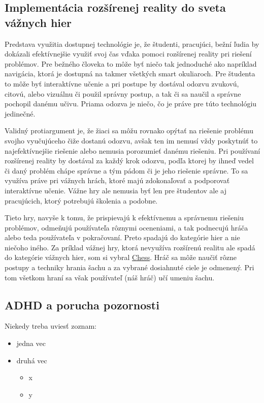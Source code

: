 \documentclass[10pt,twoside,a4paper]{article}
\begin{document}
\subsection{Implementácia rozšírenej reality do sveta vážnych hier}
\par Predstava využitia dostupnej technológie je, že študenti, pracujúci, bežní ľudia by dokázali efektívnejšie využiť svoj čas vďaka pomoci rozšírenej reality pri riešení problémov. Pre bežného človeka to môže byť niečo tak jednoduché ako napríklad navigácia, ktorá je dostupná na takmer všetkých smart okuliaroch. Pre študenta to môže byť interaktívne učenie a pri postupe by dostával odozvu zvukovú, citovú, alebo vizuálnu či použil správny postup, a tak či sa naučil a správne pochopil danému učivu. Priama odozva je niečo, čo je práve pre túto technológiu jedinečné. \par Validný protiargument je, že žiaci sa môžu rovnako opýtať na riešenie problému svojho vyučujúceho čiže dostanú odozvu, avšak ten im nemusí vždy poskytnúť to najefektívnejšie riešenie alebo nemusia porozumieť danému riešeniu. Pri používaní rozšírenej reality by dostával za každý krok odozvu, podľa ktorej by ihneď vedel či daný problém chápe správne a tým pádom či je jeho riešenie správne. To sa využíva práve pri vážnych hrách, ktoré majú zdokonaľovať a podporovať interaktívne učenie. Vážne hry ale nemusia byť len pre študentov ale aj pracujúcich, ktorý potrebujú školenia a podobne. \par Tieto hry, navyše k tomu, že prispievajú k efektívnemu a správnemu riešeniu problémov, odmeňujú používateľa rôznymi oceneniami, a tak podnecujú hráča alebo teda používateľa v pokračovaní. Preto spadajú do kategórie hier a nie niečoho iného. Za príklad vážnej hry, ktorá nevyužíva rozšírenú realitu ale spadá do kategórie vážnych hier, som si vybral \href{https://www.chess.com/}{Chess}. Hráč sa môže naučiť rôzne postupy a techniky hrania šachu a za vybrané dosiahnuté ciele je odmenený. Pri tom všetkom hraní sa však používateľ (náš hráč) učí umeniu šachu.


\subsection{ADHD a porucha pozornosti}




Niekedy treba uviesť zoznam:

\begin{itemize}
\item jedna vec
\item druhá vec
	\begin{itemize}
	\item x
	\item y
	\end{itemize}
\end{itemize}
\end{document}
